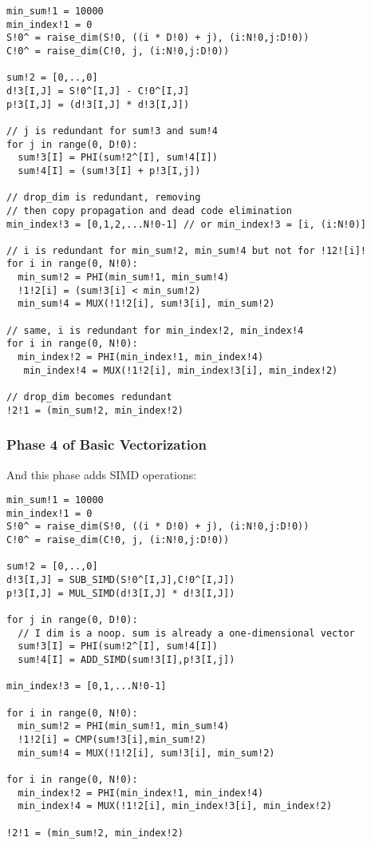 {\small
\begin{verbatim}
min_sum!1 = 10000
min_index!1 = 0
S!0^ = raise_dim(S!0, ((i * D!0) + j), (i:N!0,j:D!0))
C!0^ = raise_dim(C!0, j, (i:N!0,j:D!0))

sum!2 = [0,..,0]
d!3[I,J] = S!0^[I,J] - C!0^[I,J]
p!3[I,J] = (d!3[I,J] * d!3[I,J])

// j is redundant for sum!3 and sum!4
for j in range(0, D!0):
  sum!3[I] = PHI(sum!2^[I], sum!4[I])       
  sum!4[I] = (sum!3[I] + p!3[I,j])

// drop_dim is redundant, removing
// then copy propagation and dead code elimination 
min_index!3 = [0,1,2,...N!0-1] // or min_index!3 = [i, (i:N!0)]

// i is redundant for min_sum!2, min_sum!4 but not for !12![i]!
for i in range(0, N!0):
  min_sum!2 = PHI(min_sum!1, min_sum!4) 
  !1!2[i] = (sum!3[i] < min_sum!2)
  min_sum!4 = MUX(!1!2[i], sum!3[i], min_sum!2)

// same, i is redundant for min_index!2, min_index!4
for i in range(0, N!0):
  min_index!2 = PHI(min_index!1, min_index!4)  
   min_index!4 = MUX(!1!2[i], min_index!3[i], min_index!2)

// drop_dim becomes redundant
!2!1 = (min_sum!2, min_index!2)
\end{verbatim}
}

\subsubsection{Phase 4 of Basic Vectorization}

And this phase adds SIMD operations:

{\small
\begin{verbatim}
min_sum!1 = 10000
min_index!1 = 0
S!0^ = raise_dim(S!0, ((i * D!0) + j), (i:N!0,j:D!0))
C!0^ = raise_dim(C!0, j, (i:N!0,j:D!0))

sum!2 = [0,..,0]
d!3[I,J] = SUB_SIMD(S!0^[I,J],C!0^[I,J])
p!3[I,J] = MUL_SIMD(d!3[I,J] * d!3[I,J])

for j in range(0, D!0):
  // I dim is a noop. sum is already a one-dimensional vector
  sum!3[I] = PHI(sum!2^[I], sum!4[I])       
  sum!4[I] = ADD_SIMD(sum!3[I],p!3[I,j])

min_index!3 = [0,1,...N!0-1]   

for i in range(0, N!0):
  min_sum!2 = PHI(min_sum!1, min_sum!4) 
  !1!2[i] = CMP(sum!3[i],min_sum!2)
  min_sum!4 = MUX(!1!2[i], sum!3[i], min_sum!2)
    
for i in range(0, N!0):
  min_index!2 = PHI(min_index!1, min_index!4)  
  min_index!4 = MUX(!1!2[i], min_index!3[i], min_index!2)
   
!2!1 = (min_sum!2, min_index!2)   
\end{verbatim}
}


